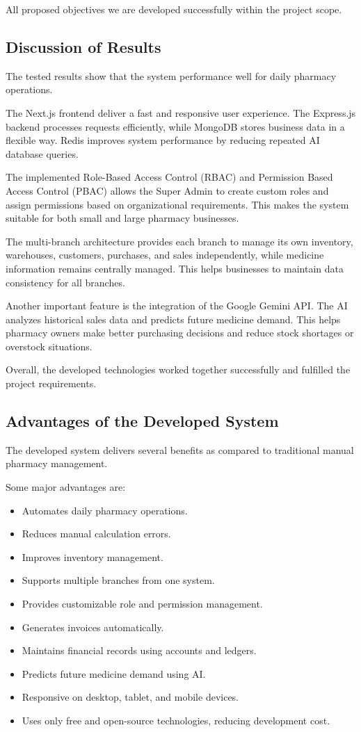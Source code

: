 All proposed objectives we are developed successfully within the project scope.

\subsection{Discussion of Results}

The tested results show that the system performance well for daily pharmacy operations.

The Next.js frontend deliver a fast and responsive user experience. The Express.js backend processes requests efficiently, while MongoDB stores business data in a flexible way. Redis improves system performance by reducing repeated AI database queries.

The implemented Role-Based Access Control (RBAC) and Permission Based Access Control (PBAC) allows the Super Admin to create custom roles and assign permissions based on organizational requirements. This makes the system suitable for both small and large pharmacy businesses.

The multi-branch architecture provides each branch to manage its own inventory, warehouses, customers, purchases, and sales independently, while medicine information remains centrally managed. This helps businesses to maintain data consistency for all branches.

Another important feature is the integration of the Google Gemini API. The AI analyzes historical sales data and predicts future medicine demand. This helps pharmacy owners make better purchasing decisions and reduce stock shortages or overstock situations.

Overall, the developed technologies worked together successfully and fulfilled the project requirements.

\subsection{Advantages of the Developed System}
The developed system delivers several benefits as compared to traditional manual pharmacy management.

Some major advantages are:
\begin{itemize}
\item Automates daily pharmacy operations.
\item Reduces manual calculation errors.
\item Improves inventory management.
\item Supports multiple branches from one system.
\item Provides customizable role and permission management.
\item Generates invoices automatically.
\item Maintains financial records using accounts and ledgers.
\item Predicts future medicine demand using AI.
\item Responsive on desktop, tablet, and mobile devices.
\item Uses only free and open-source technologies, reducing development cost.
\end{itemize}

